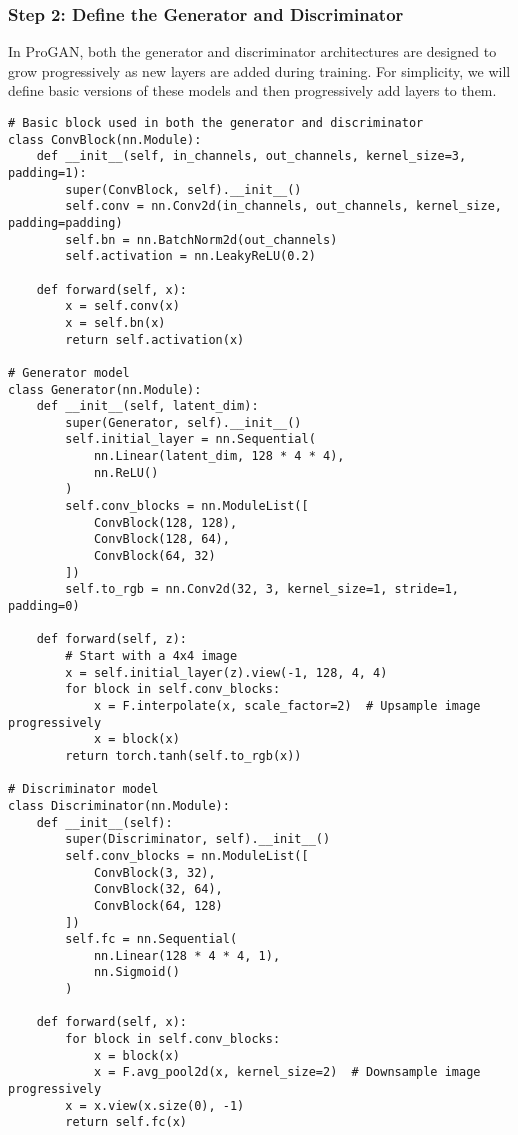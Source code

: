 \subsubsection{Step 2: Define the Generator and Discriminator}
In ProGAN, both the generator and discriminator architectures are designed to grow progressively as new layers are added during training. For simplicity, we will define basic versions of these models and then progressively add layers to them.

\begin{lstlisting}[style=python]
# Basic block used in both the generator and discriminator
class ConvBlock(nn.Module):
    def __init__(self, in_channels, out_channels, kernel_size=3, padding=1):
        super(ConvBlock, self).__init__()
        self.conv = nn.Conv2d(in_channels, out_channels, kernel_size, padding=padding)
        self.bn = nn.BatchNorm2d(out_channels)
        self.activation = nn.LeakyReLU(0.2)
    
    def forward(self, x):
        x = self.conv(x)
        x = self.bn(x)
        return self.activation(x)

# Generator model
class Generator(nn.Module):
    def __init__(self, latent_dim):
        super(Generator, self).__init__()
        self.initial_layer = nn.Sequential(
            nn.Linear(latent_dim, 128 * 4 * 4),
            nn.ReLU()
        )
        self.conv_blocks = nn.ModuleList([
            ConvBlock(128, 128),
            ConvBlock(128, 64),
            ConvBlock(64, 32)
        ])
        self.to_rgb = nn.Conv2d(32, 3, kernel_size=1, stride=1, padding=0)
    
    def forward(self, z):
        # Start with a 4x4 image
        x = self.initial_layer(z).view(-1, 128, 4, 4)
        for block in self.conv_blocks:
            x = F.interpolate(x, scale_factor=2)  # Upsample image progressively
            x = block(x)
        return torch.tanh(self.to_rgb(x))

# Discriminator model
class Discriminator(nn.Module):
    def __init__(self):
        super(Discriminator, self).__init__()
        self.conv_blocks = nn.ModuleList([
            ConvBlock(3, 32),
            ConvBlock(32, 64),
            ConvBlock(64, 128)
        ])
        self.fc = nn.Sequential(
            nn.Linear(128 * 4 * 4, 1),
            nn.Sigmoid()
        )
    
    def forward(self, x):
        for block in self.conv_blocks:
            x = block(x)
            x = F.avg_pool2d(x, kernel_size=2)  # Downsample image progressively
        x = x.view(x.size(0), -1)
        return self.fc(x)
\end{lstlisting}

